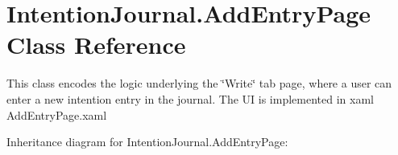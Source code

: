 \hypertarget{class_intention_journal_1_1_add_entry_page}{}\section{Intention\+Journal.\+Add\+Entry\+Page Class Reference}
\label{class_intention_journal_1_1_add_entry_page}


This class encodes the logic underlying the \char`\"{}\+Write\char`\"{} tab page, where a user can enter a new intention entry in the journal. The UI is implemented in xaml Add\+Entry\+Page.\+xaml  




Inheritance diagram for Intention\+Journal.\+Add\+Entry\+Page\+:
